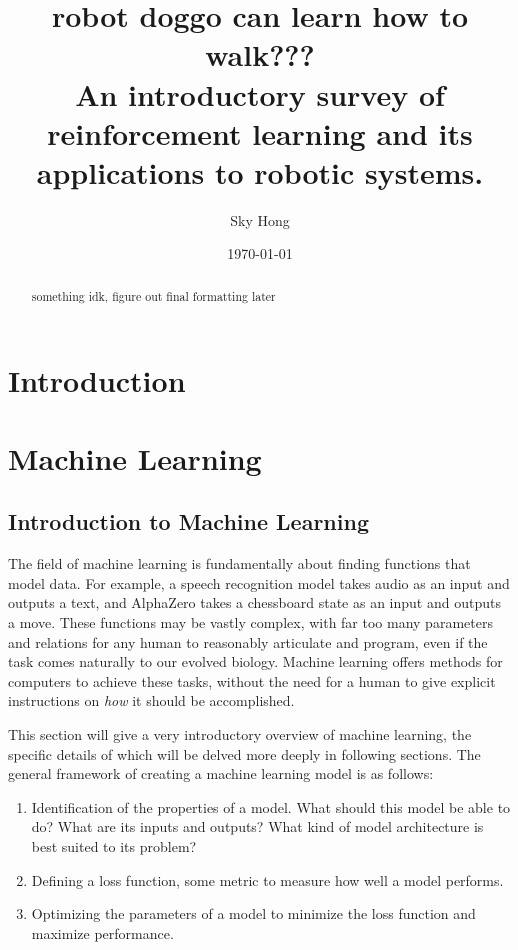 \documentclass[12pt]{report}
\theoremstyle{definition}
\theoremstyle{remark}
\begin{document}
\title{robot doggo can learn how to walk??? \\
    \large{An introductory survey of reinforcement learning and its applications to robotic systems.}}
\author{Sky Hong}
\date{\today}
\maketitle


\begin{abstract}
    something idk, figure out final formatting later
\end{abstract}


\tableofcontents

\chapter{Introduction}

\chapter{Machine Learning}
\section{Introduction to Machine Learning}
The field of machine learning is fundamentally about finding functions that model data. For example, a speech recognition model takes audio as an input and outputs a text, and AlphaZero takes a chessboard state as an input and outputs a move. These functions may be vastly complex, with far too many parameters and relations for any human to reasonably articulate and program, even if the task comes naturally to our evolved biology. Machine learning offers methods for computers to achieve these tasks, without the need for a human to give explicit instructions on \textit{how} it should be accomplished.

This section will give a very introductory overview of machine learning, the specific details of which will be delved more deeply in following sections. The general framework of creating a machine learning model is as follows:

\begin{enumerate}
    \item Identification of the properties of a model. What should this model be able to do? What are its inputs and outputs? What kind of model architecture is best suited to its problem?
    \item Defining a loss function, some metric to measure how well a model performs.
    \item Optimizing the parameters of a model to minimize the loss function and maximize performance.
\end{enumerate}
\end{document}
